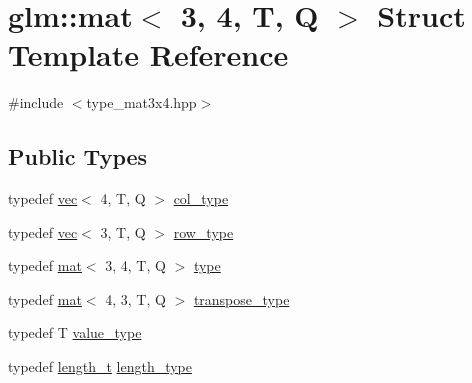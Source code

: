 \hypertarget{structglm_1_1mat_3_013_00_014_00_01_t_00_01_q_01_4}{}\section{glm\+:\+:mat$<$ 3, 4, T, Q $>$ Struct Template Reference}
\label{structglm_1_1mat_3_013_00_014_00_01_t_00_01_q_01_4}


{\ttfamily \#include $<$type\+\_\+mat3x4.\+hpp$>$}

\subsection*{Public Types}
\begin{DoxyCompactItemize}
\item 
typedef \mbox{\hyperlink{structglm_1_1vec}{vec}}$<$ 4, T, Q $>$ \mbox{\hyperlink{structglm_1_1mat_3_013_00_014_00_01_t_00_01_q_01_4_aaa23c4674cbe2dc1eda1d826b8ef721e}{col\+\_\+type}}
\item 
typedef \mbox{\hyperlink{structglm_1_1vec}{vec}}$<$ 3, T, Q $>$ \mbox{\hyperlink{structglm_1_1mat_3_013_00_014_00_01_t_00_01_q_01_4_a14121d7d6181d3e9eea914373f795c6c}{row\+\_\+type}}
\item 
typedef \mbox{\hyperlink{structglm_1_1mat}{mat}}$<$ 3, 4, T, Q $>$ \mbox{\hyperlink{structglm_1_1mat_3_013_00_014_00_01_t_00_01_q_01_4_a6742d5174ea43a0298a2bceb2636736a}{type}}
\item 
typedef \mbox{\hyperlink{structglm_1_1mat}{mat}}$<$ 4, 3, T, Q $>$ \mbox{\hyperlink{structglm_1_1mat_3_013_00_014_00_01_t_00_01_q_01_4_af38d159b4f750dd5fab7d19b44c82731}{transpose\+\_\+type}}
\item 
typedef T \mbox{\hyperlink{structglm_1_1mat_3_013_00_014_00_01_t_00_01_q_01_4_a5fafacf57e2d28a8de693056c450088c}{value\+\_\+type}}
\item 
typedef \mbox{\hyperlink{namespaceglm_a090a0de2260835bee80e71a702492ed9}{length\+\_\+t}} \mbox{\hyperlink{structglm_1_1mat_3_013_00_014_00_01_t_00_01_q_01_4_a6a07c3870b8e6d4ba5f1ec8fa988d9bf}{length\+\_\+type}}
\end{DoxyCompactItemize}

